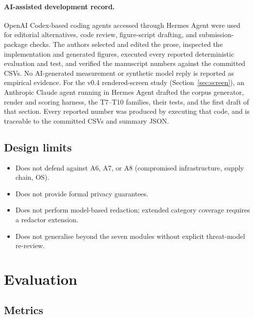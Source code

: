 \documentclass[pdflatex,sn-mathphys-num]{sn-jnl}
\begin{document}
\paragraph{AI-assisted development record.}
OpenAI Codex-based coding agents accessed through Hermes Agent were used for
editorial alternatives, code review, figure-script drafting, and
submission-package checks. The authors selected and edited the prose, inspected
the implementation and generated figures, executed every reported deterministic
evaluation and test, and verified the manuscript numbers against the committed
CSVs. No AI-generated measurement or synthetic model reply is reported as
empirical evidence. For the v0.4 rendered-screen study
(Section~\ref{sec:screen}), an Anthropic Claude agent running in Hermes Agent
drafted the corpus generator, render and scoring harness, the T7--T10
families, their tests, and the first draft of that section. Every reported
number was produced by executing that code, and is traceable to the
committed CSVs and summary JSON.

\subsection{Design limits}\label{sec:designlimits}

\begin{itemize}
  \item Does not defend against A6, A7, or A8 (compromised infrastructure,
        supply chain, OS).
  \item Does not provide formal privacy guarantees.
  \item Does not perform model-based redaction; extended category coverage
        requires a redactor extension.
  \item Does not generalise beyond the seven modules without explicit
        threat-model re-review.
\end{itemize}

\section{Evaluation}\label{sec:eval}

\subsection{Metrics}\label{sec:metrics}
\end{document}
